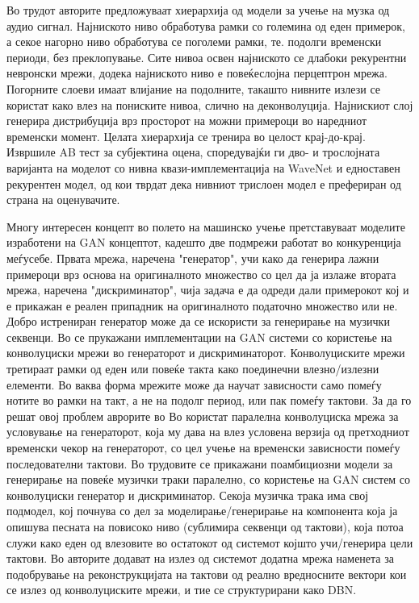 Во трудот \cite{Mehri2016} авторите предложуваат хиерархија од модели за учење на музка од аудио сигнал. Најниското ниво обработува рамки со големина од еден примерок, а секое нагорно ниво обработува се поголеми рамки, те. подолги временски периоди, без преклопување. Сите нивоа освен најниското се длабоки рекурентни невронски мрежи, додека најниското ниво е повеќеслојна перцептрон мрежа. Погорните слоеви имаат влијание на подолните, такашто нивните излези се користат како влез на пониските нивоа, слично на деконволуција. Најнискиот слој генерира дистрибуција врз просторот на можни примероци во наредниот временски момент. Целата хиерархија се тренира во целост крај-до-крај. Извршиле AB тест за субјектина оцена, споредувајќи ги дво- и трослојната варијанта на моделот со нивна квази-имплементација на WaveNet \cite{Oord2016} и едноставен рекурентен модел, од кои тврдат дека нивниот трислоен модел е префериран од страна на оценувачите.

Многу интересен концепт во полето на машинско учење претставуваат моделите изработени на GAN концептот, кадешто две подмрежи работат во конкуренција меѓусебе. Првата мрежа, наречена "генератор", учи како да генерира лажни примероци врз основа на оригиналното множество со цел да ја излаже втората мрежа, наречена "дискриминатор", чија задача е да одреди дали примерокот кој и е прикажан е реален припадник на оригиналното податочно множество или не. Добро истрениран генератор може да се искористи за генерирање на музички секвенци. Во \cite{Yang2017,Dong2017,Dong2018} се прукажани имплементации на GAN системи со користење на конволуциски мрежи во генераторот и дискриминаторот. Конволуциските мрежи третираат рамки од еден или повеќе такта како поединечни влезно/излезни елементи. Во ваква форма мрежите може да научат зависности само помеѓу нотите во рамки на такт, а не на подолг период, или пак помеѓу тактови. За да го решат овој проблем аврорите во Во \cite{Yang2017} користат паралелна конволуциска мрежа за условување на генераторот, која му дава на влез условена верзија од претходниот временски чекор на генераторот, со цел учење на временски зависности помеѓу последователни тактови. Во трудовите \cite{Dong2017,Dong2018} се прикажани поамбициозни модели за генерирање на повеќе музички траки паралелно, со користење на GAN систем со конволуциски генератор и дискриминатор. Секоја музичка трака има свој подмодел, кој почнува со дел за моделирање/генерирање на компонента која ја опишува песната на повисоко ниво (сублимира секвенци од тактови), која потоа служи како еден од влезовите во остатокот од системот којшто учи/генерира цели тактови. Во \cite{Dong2018} авторите додават на излез од системот додатна мрежа наменета за подобрување на реконструкцијата на тактови од реално вредносните вектори кои се излез од конволуциските мрежи, и тие се структурирани како DBN.

